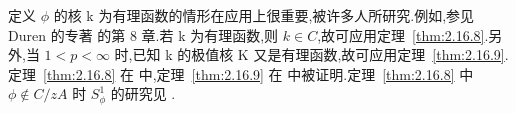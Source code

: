 定义 $\phi$ 的核 k 为有理函数的情形在应用上很重要,被许多人所研究.例如,参见 Duren 的专著 \cite{ch2:11} 的第 8 章.若 k 为有理函数,则 $k \in C$,故可应用定理~\ref{thm:2.16.8}.另外,当 $1 < p < \infty$ 时,已知 k 的极值核 K 又是有理函数,故可应用定理~\ref{thm:2.16.9}.定理~\ref{thm:2.16.8} 在 \cite{ch2:8} 中,定理~\ref{thm:2.16.9} 在 \cite{ch2:12} 中被证明.定理~\ref{thm:2.16.8} 中 $\phi \notin C/zA$ 时 $S_{\phi}^{1}$ 的研究见 \cite{ch2:13}.
